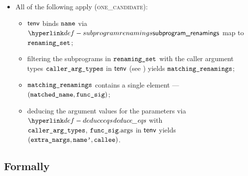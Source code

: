 \begin{itemize}
  \item All of the following apply (\textsc{one\_candidate}):
  \begin{itemize}
    \item $\tenv$ binds $\name$ via $\subprogramrenamings$ map to $\renamingset$;
    \item filtering the subprograms in $\renamingset$ with the caller argument types $\callerargtypes$
          in $\tenv$ (see ) yields $\matchingrenamings$\ProseOrTypeError;
    \item $\matchingrenamings$ contains a single element --- $(\matchedname, \funcsig)$;
    \item deducing the argument values for the parameters via $\deduceeqs$ with \\
          $\callerargtypes$, $\funcsig.\funcargs$ in $\tenv$ yields \\
          $(\extranargs, \namep, \callee)$\ProseOrTypeError.
  \end{itemize}
\end{itemize}



\subsection{Formally}
\begin{mathpar}
\end{mathpar}

\begin{mathpar}
\end{mathpar}

